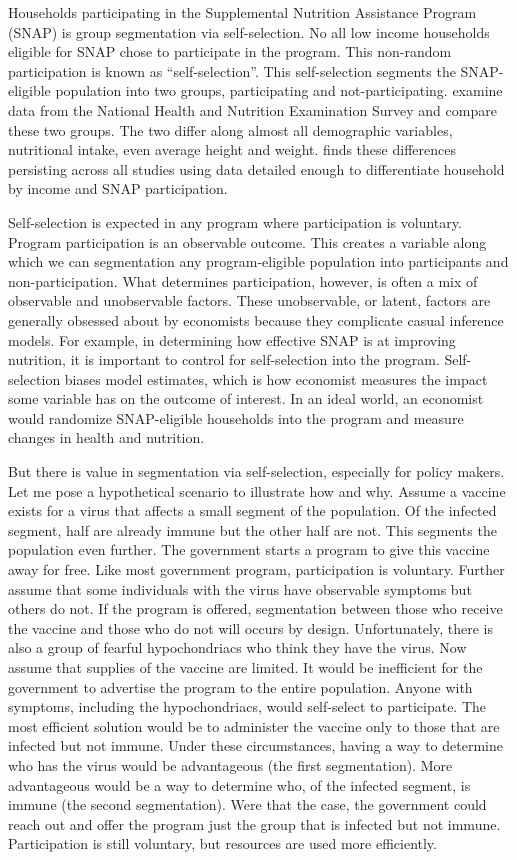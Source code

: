 \documentclass[12pt,letterpaperpaper,]{book}
\begin{document}
Households participating in the Supplemental Nutrition Assistance
Program (SNAP) is group segmentation via self-selection. No all low
income households eligible for SNAP chose to participate in the program.
This non-random participation is known as ``self-selection''. This
self-selection segments the SNAP-eligible population into two groups,
participating and not-participating. \citet{cole_diet_2008} examine data
from the National Health and Nutrition Examination Survey and compare
these two groups. The two differ along almost all demographic variables,
nutritional intake, even average height and weight.
\citet{bitler_health_2015} finds these differences persisting across all
studies using data detailed enough to differentiate household by income
and SNAP participation.

Self-selection is expected in any program where participation is
voluntary. Program participation is an observable outcome. This creates
a variable along which we can segmentation any program-eligible
population into participants and non-participation. What determines
participation, however, is often a mix of observable and unobservable
factors. These unobservable, or latent, factors are generally obsessed
about by economists because they complicate casual inference models. For
example, in determining how effective SNAP is at improving nutrition, it
is important to control for self-selection into the program.
Self-selection biases model estimates, which is how economist measures
the impact some variable has on the outcome of interest. In an ideal
world, an economist would randomize SNAP-eligible households into the
program and measure changes in health and nutrition.

But there is value in segmentation via self-selection, especially for
policy makers. Let me pose a hypothetical scenario to illustrate how and
why. Assume a vaccine exists for a virus that affects a small segment of
the population. Of the infected segment, half are already immune but the
other half are not. This segments the population even further. The
government starts a program to give this vaccine away for free. Like
most government program, participation is voluntary. Further assume that
some individuals with the virus have observable symptoms but others do
not. If the program is offered, segmentation between those who receive
the vaccine and those who do not will occurs by design. Unfortunately,
there is also a group of fearful hypochondriacs who think they have the
virus. Now assume that supplies of the vaccine are limited. It would be
inefficient for the government to advertise the program to the entire
population. Anyone with symptoms, including the hypochondriacs, would
self-select to participate. The most efficient solution would be to
administer the vaccine only to those that are infected but not immune.
Under these circumstances, having a way to determine who has the virus
would be advantageous (the first segmentation). More advantageous would
be a way to determine who, of the infected segment, is immune (the
second segmentation). Were that the case, the government could reach out
and offer the program just the group that is infected but not immune.
Participation is still voluntary, but resources are used more
efficiently.
\end{document}
